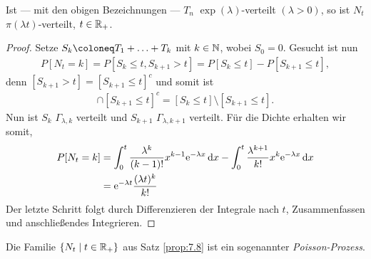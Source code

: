 \begin{prop}
\label{prop:7.8}
Ist --- mit den obigen Bezeichnungen --- $T_{n}$ $\exp (\lambda
)$-verteilt $(\lambda > 0)$, so ist $N_{t}$ $\pi (\lambda t)$-verteilt, $t\in
\mathbb{R}_{+}$.\fishhere
\end{prop}
\begin{proof}
Setze
$S_k\defl T_1+\ldots+T_k$ mit $k\in\mathbb{N}$, wobei $S_0=0$. Gesucht ist nun
\begin{align*}
P[N_t = k] = P[S_k\le t, S_{k+1}> t] = P[S_k\le t]-P[S_{k+1}\le t],
\end{align*}
denn $[S_{k+1}> t]=[S_{k+1}\le t]^c$ und somit ist
\begin{align*}
[S_k\le t]\cap[S_{k+1}\le t]^c = [S_k\le t]\setminus[S_{k+1}\le t].
\end{align*}
Nun ist $S_k$ $\Gamma_{\lambda,k}$ verteilt und $S_{k+1}$
$\Gamma_{\lambda,k+1}$ verteilt. Für die Dichte erhalten wir somit,
\begin{align*}
P[N_t = k] &= 
\int_0^t \frac{\lambda^k}{(k-1)!}x^{k-1}\mathrm{e}^{-\lambda x}\,\mathrm{d} x-
\int_0^t \frac{\lambda^{k+1}}{k!}x^{k}\mathrm{e}^{-\lambda x}\,\mathrm{d} x\\
&= \mathrm{e}^{-\lambda t}\frac{(\lambda t)^k}{k!}
\end{align*}
Der letzte Schritt folgt durch Differenzieren der Integrale nach $t$,
Zusammenfassen und anschließendes Integrieren.\qedhere
\end{proof}
\begin{bem}
\label{bem:7.8}
Die Familie $\{N_{t}\mid t\in \mathbb{R}_{+}\}$ aus Satz
\ref{prop:7.8} ist ein sogenannter \emph{Poisson-Prozess}.\maphere
\end{bem} 